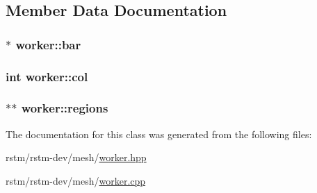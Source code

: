 \subsection{Member Data Documentation}
\hypertarget{classworker_af93ecf55b0e56a15d1a302fe4a47ce45}{
\subsubsection[{bar}]{$\ast$ worker\-::bar\hspace{0.3cm}{\ttfamily [private]}}}\label{classworker_af93ecf55b0e56a15d1a302fe4a47ce45}
\hypertarget{classworker_a51224d4f9f82d91a384eff07d7b35ad2}{
\subsubsection[{col}]{\setlength{\rightskip}{0pt plus 5cm}int worker\-::col\hspace{0.3cm}{\ttfamily [private]}}}\label{classworker_a51224d4f9f82d91a384eff07d7b35ad2}
\hypertarget{classworker_a004ca03f66fc3a27469e3b81c0d9dce8}{
\subsubsection[{regions}]{$\ast$$\ast$ worker\-::regions\hspace{0.3cm}{\ttfamily [private]}}}\label{classworker_a004ca03f66fc3a27469e3b81c0d9dce8}


The documentation for this class was generated from the following files\-:\begin{DoxyCompactItemize}
\item 
rstm/rstm-\/dev/mesh/\hyperlink{worker_8hpp}{worker.\-hpp}\item 
rstm/rstm-\/dev/mesh/\hyperlink{worker_8cpp}{worker.\-cpp}\end{DoxyCompactItemize}
